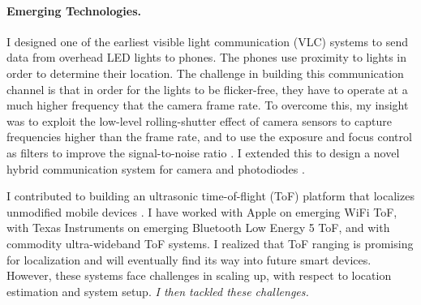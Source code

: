 \documentclass[10pt]{article}
\begin{document}


\paragraph{Emerging Technologies. }

I designed one of the earliest visible light communication (VLC) systems to send data from overhead LED lights to phones. The phones use proximity to lights in order to determine their location.  The challenge in building this communication channel is that in order for the lights to be flicker-free, they have to operate at a much higher frequency that the camera frame rate. %
To overcome this, my insight was to exploit the low-level rolling-shutter effect of camera sensors to capture frequencies higher than the frame rate, %
 and to use the exposure and focus control as filters to improve the signal-to-noise ratio \cite{rajagopal2014visual, rajagopal2014demonstration}. I extended this to design a novel hybrid communication system for camera and photodiodes \cite{rajagopal2014hybrid}. 

I contributed to building an ultrasonic time-of-flight (ToF) platform that localizes unmodified mobile devices \cite{rtas-alps-platform, lazik2015alps,lazik2015alpsdemo}.  I have worked with Apple on emerging WiFi ToF, with Texas Instruments on emerging Bluetooth Low Energy 5 ToF, and with commodity ultra-wideband ToF systems. I realized that ToF ranging is promising for localization and will eventually find its way into future smart devices.  However, these systems face challenges in scaling up, with respect to location estimation and system setup. \textit{I then tackled these challenges.} 
\end{document}
